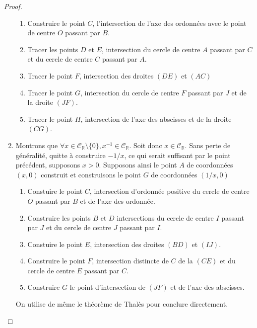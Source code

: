 \documentclass[a4paper,12pt,french,draft]{report}
\begin{document}
\begin{proof}
\begin{enumerate}
						\begin{enumerate}
							\item Construire le point $C$, l'intersection de l'axe des ordonnées avec le point de centre $O$ passant par $B$.
							\item Tracer les points $D$ et $E$, intersection du cercle de centre $A$ passant par $C$ et du cercle de centre $C$ passant par $A$.
							\item Tracer le point $F$, intersection des droites $(DE)$ et $(AC)$
							\item Tracer le point $G$, intersection du cercle de centre $F$ passant par $J$ et de la droite $(JF)$.
							\item Tracer le point $H$, intersection de l'axe des abscisses et de la droite $(CG)$.
						\end{enumerate}
						
					\item Montrons que \( \forall x \in \mathscr{C}_\mathbb{R}\setminus \{0\}, x^{-1} \in \mathscr{C}_\mathbb{R} \). Soit donc $x \in \mathscr{C}_\mathbb{R}$. Sans perte de généralité, quitte à construire $-1/x$, ce qui serait suffisant par le point précédent, supposons $x > 0$. Supposons ainsi le point $A$ de coordonnées $(x, 0)$ construit et construisons le point $G$ de coordonnées $(1/x, 0)$
					\begin{enumerate}
						\item Constuire le point $C$, intersection d'ordonnée positive du cercle de centre $O$ passant par $B$ et de l'axe des ordonnée.
						\item Construire les points $B$ et $D$ intersections du cercle de centre $I$ passant par $J$ et du cercle de centre $J$ passant par $I$.
						\item Constuire le point $E$, intersection des droites $(BD)$ et $(IJ)$.
						\item Construire le point $F$, intersection distincte de $C$ de la $(CE)$ et du cercle de centre $E$ passant par $C$.
						\item Construire $G$ le point d'intersection de $(JF)$ et de l'axe des abscisses.
					\end{enumerate}
					On utilise de même le théorème de Thalès pour conclure directement.
							
				\end{enumerate}
			\end{proof}
		
\end{document}
